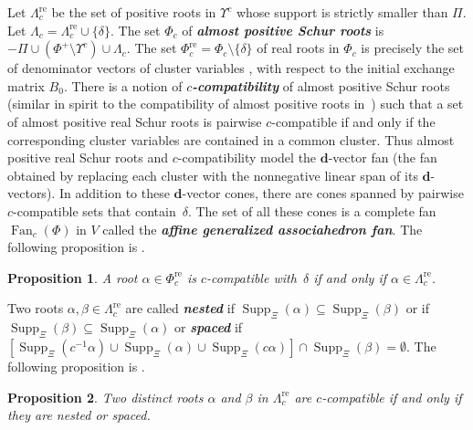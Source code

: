 \documentclass{amsart}
\newtheorem{proposition}{Proposition}[section]
\theoremstyle{definition}
\theoremstyle{remark}
\numberwithin{equation}{section}
\newcommand{\newword}[1]{\textbf{\emph{#1}}}
\newcommand{\set}[1]{{\lbrace #1 \rbrace}}
\newcommand{\0}{{\mathbf{0}}}
\newcommand{\Fan}{\operatorname{Fan}}
\newcommand{\re}{\mathrm{re}}
\newcommand{\dd}{{\mathbf d}}
\newcommand{\RSChar}{\Phi}
\newcommand{\RS}{\RSChar}
\newcommand{\RSpos}{\RS^+}
\newcommand{\SimplesChar}{\Pi}
\newcommand{\Simples}{\SimplesChar}
\newcommand{\RSTChar}{\Upsilon}
\newcommand{\RST}[1]{\RSTChar^{#1}}
\newcommand{\SimplesTChar}{\Xi}
\newcommand{\SuppT}{\operatorname{Supp}_\SimplesTChar}
\newcommand{\AP}[1]{\RS_{#1}}
\newcommand{\APre}[1]{\AP{#1}^\re}
\newcommand{\APTChar}{\Lambda}
\newcommand{\APT}[1]{\APTChar_{#1}}
\newcommand{\APTre}[1]{\APT{#1}^\re}
\begin{document}
Let $\APTre{c}$ be the set of positive roots in $\RST{c}$ whose support is strictly smaller than $\Simples$.
Let $\APT{c}=\APTre{c}\cup\set\delta$.
The set $\AP{c}$ of \newword{almost positive Schur roots} is ${-\Simples\cup(\RSpos\setminus\RST{c})\cup\APT{c}}$.
The set $\APre{c}=\AP{c}\setminus\set\delta$ of real roots in $\AP{c}$ is precisely the set of denominator vectors of cluster variables \cite[Theorem~1.2]{affdenom}, with respect to the initial exchange matrix $B_0$.
There is a notion \cite[Definition~4.3]{affdenom} of \newword{$c$-compatibility} of almost positive Schur roots (similar in spirit to the compatibility of almost positive roots in~\cite{ga}) such that a set of almost positive real Schur roots is pairwise $c$-compatible if and only if the corresponding cluster variables are contained in a common cluster.
Thus almost positive real Schur roots and $c$-compatibility model the $\dd$-vector fan (the fan obtained by replacing each cluster with the nonnegative linear span of its $\dd$-vectors).
In addition to these $\dd$-vector cones, there are cones spanned by pairwise $c$-compatible sets that contain~$\delta$.
The set of all these cones is a complete fan $\Fan_c(\RS)$ in $V$ called the \newword{affine generalized associahedron fan}.
The following proposition is \cite[Proposition~5.6]{affdenom}.

\begin{proposition}\label{delta c compat}
A root $\alpha\in\APre{c}$ is $c$-compatible with~$\delta$ if and only if $\alpha\in\APTre{c}$.
\end{proposition}

Two roots $\alpha,\beta\in\APTre{c}$ are called \newword{nested} if $\SuppT(\alpha)\subseteq\SuppT(\beta)$ or if $\SuppT(\beta)\subseteq\SuppT(\alpha)$ or \newword{spaced} if $[\SuppT(c^{-1}\alpha)\cup\SuppT(\alpha)\cup\SuppT(c\alpha)]\cap\SuppT(\beta)=\emptyset$.
The following proposition is \cite[Proposition~5.12]{affdenom}.

\begin{proposition}\label{compatible in tubes}
Two distinct roots $\alpha$ and $\beta$ in $\APTre{c}$ are $c$-compatible if and only if they are nested or spaced.
\end{proposition}
\end{document}
